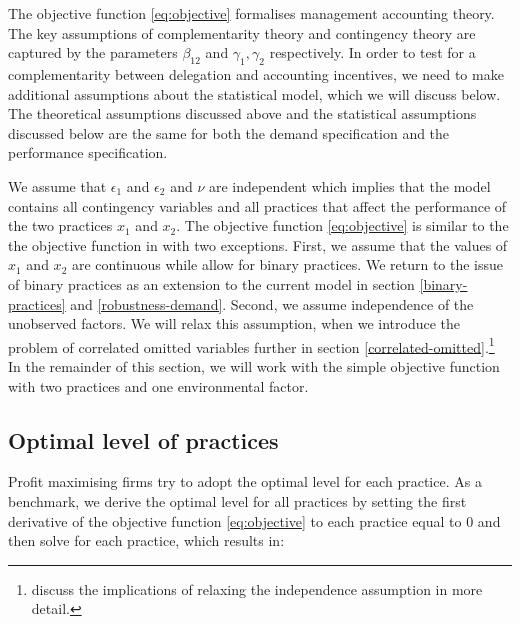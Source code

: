 \documentclass[12pt]{article}
\begin{document}
The objective function \eqref{eq:objective} formalises management accounting theory. The key assumptions of complementarity theory and contingency theory are captured by the parameters $\beta_{12}$ and $\gamma_1, \gamma_2$ respectively. In order to test for a complementarity between delegation and accounting incentives, we need to make additional assumptions about the statistical model, which we will discuss below. The theoretical assumptions discussed above and the statistical assumptions discussed below are the same for both the demand specification and the performance specification.

We assume that $\epsilon_1$ and $\epsilon_2$ and $\nu$ are independent which implies that the model contains all contingency variables and all practices that affect the performance of the two practices $x_1$ and $x_2$. The objective function \eqref{eq:objective} is similar to the the objective function in \citet{kretschmer_competitive_2012} with two exceptions. First, we assume that the values of $x_1$ and $x_2$ are continuous while \citet{kretschmer_competitive_2012} allow for binary practices. We return to the issue of binary practices as an extension to the current model in section \ref{binary-practices} and \ref{robustness-demand}. Second, we assume independence of the unobserved factors. We will relax this assumption, when we introduce the problem of correlated omitted variables further in section \ref{correlated-omitted}.\footnote{\citet{athey_empirical_1998} discuss the implications of relaxing the independence assumption in more detail.}  In the remainder of this section, we will work with the simple objective function with two practices and one environmental factor. 

\subsection{Optimal level of practices} \label{optimal-level-of-practices}

Profit maximising firms try to adopt the optimal level for each practice. As a benchmark, we derive the optimal level for all practices by setting the first derivative of the objective function \eqref{eq:objective} to each practice equal to $0$ and then solve for each practice, which results in:
\end{document}
